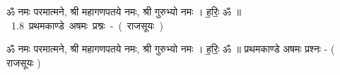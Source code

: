 \documentclass[17pt]{extarticle}
\begin{document}
\begin{titlepage}
    \begin{center}
 
\begin{sanskrit}
    { \Large
    ॐ नमः परमात्मने, श्री महागणपतये नमः, 
श्री गुरुभ्यो नमः । ह॒रिः॒ ॐ ॥ 
    }
    \\
    \vspace{2.5cm}
    \mbox{ \Huge
    1.8     प्रथमकाण्डे अषमः प्रश्नः - ( राजसूयः )   }
\end{sanskrit}
\end{center}

\end{titlepage}
\tableofcontents

ॐ नमः परमात्मने, श्री महागणपतये नमः,
श्री गुरुभ्यो नमः । ह॒रिः॒ ॐ ॥      प्रथमकाण्डे अषमः प्रश्नः - ( राजसूयः ) \newline

\end{document}

